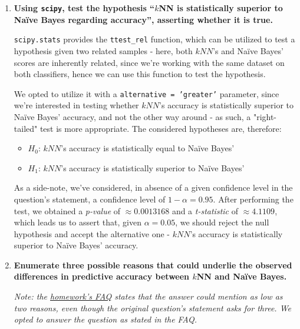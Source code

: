 \documentclass[12pt]{article}
\begin{document}
\begin{enumerate}[leftmargin=\labelsep,resume]
        \pagebreak

  \item \textbf{Using \texttt{scipy}, test the hypothesis “$k$NN is statistically superior to Naïve Bayes regarding
          accuracy”, asserting whether it is true.}

        \texttt{scipy.stats} provides the \texttt{ttest\_rel} function, which can be utilized
        to test a hypothesis given two related samples - here, both $kNN$'s and Naïve Bayes'
        scores are inherently related, since we're working with the same dataset on both
        classifiers, hence we can use this function to test the hypothesis.

        We opted to utilize it with a \texttt{alternative = 'greater'} parameter, since
        we're interested in testing whether $kNN$'s accuracy is statistically superior
        to Naïve Bayes' accuracy, and not the other way around - as such, a "right-tailed"
        test is more appropriate.
        The considered hypotheses are, therefore:

        \begin{itemize}
          \item $H_0$: $kNN$'s accuracy is statistically equal to Naïve Bayes'
          \item $H_1$: $kNN$'s accuracy is statistically superior to Naïve Bayes'
        \end{itemize}

        As a side-note, we've considered, in absence of a given confidence level in the
        question's statement, a confidence level of $1 - \alpha = 0.95$.
        After performing the test, we obtained a \textit{p-value} of $\approx 0.0013168$ and
        a \textit{t-statistic} of $\approx 4.1109$, which leads us to assert that, given
        $\alpha = 0.05$, we should reject the null hypothesis and accept the alternative
        one - $kNN$'s accuracy is statistically superior to Naïve Bayes' accuracy.

        \pagebreak

  \item \textbf{Enumerate three possible reasons that could underlie the observed differences in predictive
          accuracy between $k$NN and Naïve Bayes.}

        \textit{Note: the \href{https://fenix.tecnico.ulisboa.pt/disciplinas/Apre2/2022-2023/1-semestre/homeworks}{homework's FAQ}
          states that the answer could mention as low as two reasons, even though the original
          question's statement asks for three. We opted to answer the question as stated in
          the FAQ.}


\end{enumerate}
\end{document}

